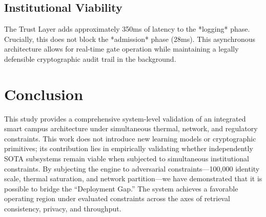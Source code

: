 \documentclass[conference]{IEEEtran}
\begin{document}
\subsection{Institutional Viability}
The Trust Layer adds approximately 350ms of latency to the *logging* phase. Crucially, this does not block the *admission* phase (28ms). This asynchronous architecture allows for real-time gate operation while maintaining a legally defensible cryptographic audit trail in the background.

\section{Conclusion}
This study provides a comprehensive system-level validation of an integrated smart campus architecture under simultaneous thermal, network, and regulatory constraints. This work does not introduce new learning models or cryptographic primitives; its contribution lies in empirically validating whether independently SOTA subsystems remain viable when subjected to simultaneous institutional constraints. By subjecting the engine to adversarial constraints---100,000 identity scale, thermal saturation, and network partition---we have demonstrated that it is possible to bridge the ``Deployment Gap.'' The system achieves a favorable operating region under evaluated constraints across the axes of retrieval consistency, privacy, and throughput. 
\end{document}
